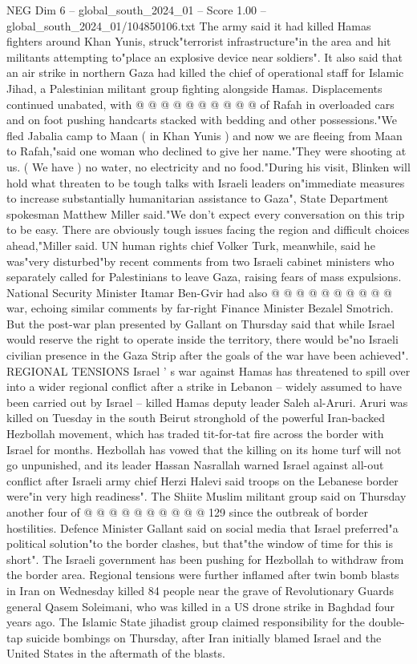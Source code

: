 \begin{textsample}{NEG Dim 6 – global\_south\_2024\_01 – Score 1.00 – global\_south\_2024\_01/104850106.txt}
The army said it had killed Hamas fighters around Khan Yunis, struck"terrorist infrastructure"in the area and hit militants attempting to"place an explosive device near soldiers".
It also said that an air strike in northern Gaza had killed the chief of operational staff for Islamic Jihad, a Palestinian militant group fighting alongside Hamas.
Displacements continued unabated, with @ @ @ @ @ @ @ @ @ @ of Rafah in overloaded cars and on foot pushing handcarts stacked with bedding and other possessions."We fled Jabalia camp to Maan ( in Khan Yunis ) and now we are fleeing from Maan to Rafah,"said one woman who declined to give her name."They were shooting at us. ( We have ) no water, no electricity and no food."During his visit, Blinken will hold what threaten to be tough talks with Israeli leaders on"immediate measures to increase substantially humanitarian assistance to Gaza", State Department spokesman Matthew Miller said."We don't expect every conversation on this trip to be easy.
There are obviously tough issues facing the region and difficult choices ahead,"Miller said.
UN human rights chief Volker Turk, meanwhile, said he was"very disturbed"by recent comments from two Israeli cabinet ministers who separately called for Palestinians to leave Gaza, raising fears of mass expulsions.
National Security Minister Itamar Ben-Gvir had also @ @ @ @ @ @ @ @ @ @ war, echoing similar comments by far-right Finance Minister Bezalel Smotrich.
But the post-war plan presented by Gallant on Thursday said that while Israel would reserve the right to operate inside the territory, there would be"no Israeli civilian presence in the Gaza Strip after the goals of the war have been achieved".
REGIONAL TENSIONS Israel ' s war against Hamas has threatened to spill over into a wider regional conflict after a strike in Lebanon -- widely assumed to have been carried out by Israel -- killed Hamas deputy leader Saleh al-Aruri.
Aruri was killed on Tuesday in the south Beirut stronghold of the powerful Iran-backed Hezbollah movement, which has traded tit-for-tat fire across the border with Israel for months.
Hezbollah has vowed that the killing on its home turf will not go unpunished, and its leader Hassan Nasrallah warned Israel against all-out conflict after Israeli army chief Herzi Halevi said troops on the Lebanese border were"in very high readiness".
The Shiite Muslim militant group said on Thursday another four of @ @ @ @ @ @ @ @ @ @ 129 since the outbreak of border hostilities.
Defence Minister Gallant said on social media that Israel preferred"a political solution"to the border clashes, but that"the window of time for this is short".
The Israeli government has been pushing for Hezbollah to withdraw from the border area.
Regional tensions were further inflamed after twin bomb blasts in Iran on Wednesday killed 84 people near the grave of Revolutionary Guards general Qasem Soleimani, who was killed in a US drone strike in Baghdad four years ago.
The Islamic State jihadist group claimed responsibility for the double-tap suicide bombings on Thursday, after Iran initially blamed Israel and the United States in the aftermath of the blasts.

\end{textsample}

